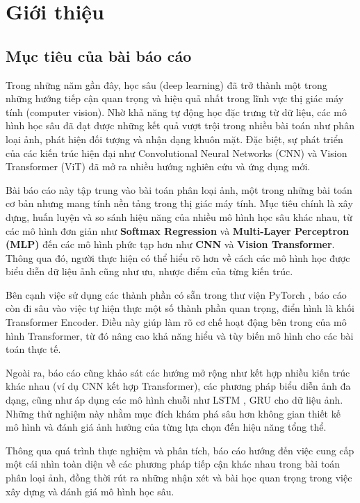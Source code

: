 \section{Giới thiệu}

\subsection{Mục tiêu của bài báo cáo}

Trong những năm gần đây, học sâu (deep learning) đã trở thành một trong những hướng tiếp cận quan trọng và hiệu quả nhất trong lĩnh vực thị giác máy tính (computer vision). Nhờ khả năng tự động học đặc trưng từ dữ liệu, các mô hình học sâu đã đạt được những kết quả vượt trội trong nhiều bài toán như phân loại ảnh, phát hiện đối tượng và nhận dạng khuôn mặt. Đặc biệt, sự phát triển của các kiến trúc hiện đại như Convolutional Neural Networks (CNN) \cite{vaswani2017attention} và Vision Transformer (ViT) \cite{dosovitskiy2020image} đã mở ra nhiều hướng nghiên cứu và ứng dụng mới.

Bài báo cáo này tập trung vào bài toán phân loại ảnh, một trong những bài toán cơ bản nhưng mang tính nền tảng trong thị giác máy tính. Mục tiêu chính là xây dựng, huấn luyện và so sánh hiệu năng của nhiều mô hình học sâu khác nhau, từ các mô hình đơn giản như \textbf{Softmax Regression} và \textbf{Multi-Layer Perceptron (MLP)} đến các mô hình phức tạp hơn như \textbf{CNN} và \textbf{Vision Transformer}. Thông qua đó, người thực hiện có thể hiểu rõ hơn về cách các mô hình học được biểu diễn dữ liệu ảnh cũng như ưu, nhược điểm của từng kiến trúc.

Bên cạnh việc sử dụng các thành phần có sẵn trong thư viện PyTorch \cite{paszke2019pytorch}, báo cáo còn đi sâu vào việc tự hiện thực một số thành phần quan trọng, điển hình là khối Transformer Encoder. Điều này giúp làm rõ cơ chế hoạt động bên trong của mô hình Transformer, từ đó nâng cao khả năng hiểu và tùy biến mô hình cho các bài toán thực tế.

Ngoài ra, báo cáo cũng khảo sát các hướng mở rộng như kết hợp nhiều kiến trúc khác nhau (ví dụ CNN kết hợp Transformer), các phương pháp biểu diễn ảnh đa dạng, cũng như áp dụng các mô hình chuỗi như LSTM \cite{vennerod2021lstm}, GRU \cite{chung2014empirical} cho dữ liệu ảnh. Những thử nghiệm này nhằm mục đích khám phá sâu hơn không gian thiết kế mô hình và đánh giá ảnh hưởng của từng lựa chọn đến hiệu năng tổng thể.

Thông qua quá trình thực nghiệm và phân tích, báo cáo hướng đến việc cung cấp một cái nhìn toàn diện về các phương pháp tiếp cận khác nhau trong bài toán phân loại ảnh, đồng thời rút ra những nhận xét và bài học quan trọng trong việc xây dựng và đánh giá mô hình học sâu.

